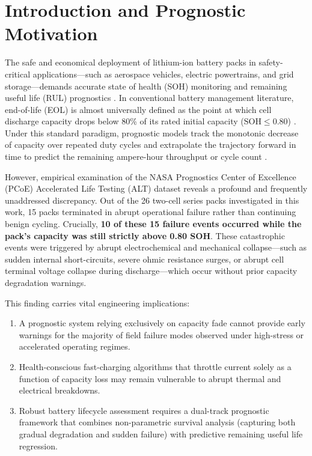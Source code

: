 \label{chap.7}

\section{Introduction and Prognostic Motivation}

The safe and economical deployment of lithium-ion battery packs
in safety-critical applications---such as aerospace vehicles,
electric powertrains, and grid storage---demands accurate state
of health (SOH) monitoring and remaining useful life (RUL) prognostics
\cite{saxena2015remaining, ge2021multistep}. In conventional battery
management literature, end-of-life (EOL) is almost universally defined as
the point at which cell discharge capacity drops below 80\% of its
rated initial capacity ($\mathrm{SOH} \le 0.80$)
\cite{bloom2001accelerated, han2019review}. Under this standard
paradigm, prognostic models track the monotonic decrease of capacity
over repeated duty cycles and extrapolate the trajectory forward in time
to predict the remaining ampere-hour throughput or cycle count
\cite{yang2018fast}.

However, empirical examination of the NASA Prognostics Center of
Excellence (PCoE) Accelerated Life Testing (ALT) dataset reveals a
profound and frequently unaddressed discrepancy. Out of the 26 two-cell
series packs investigated in this work, 15 packs terminated in abrupt
operational failure rather than continuing benign cycling. Crucially,
\textbf{10 of these 15 failure events occurred while the pack's
capacity was still strictly above 0.80 SOH}. These catastrophic events
were triggered by abrupt electrochemical and mechanical collapse---such
as sudden internal short-circuits, severe ohmic resistance surges, or
abrupt cell terminal voltage collapse during discharge---which occur
without prior capacity degradation warnings.

This finding carries vital engineering implications:
\begin{enumerate}
  \item A prognostic system relying exclusively on capacity fade cannot
  provide early warnings for the majority of field failure modes observed
  under high-stress or accelerated operating regimes.
  \item Health-conscious fast-charging algorithms that throttle current
  solely as a function of capacity loss may remain vulnerable to abrupt
  thermal and electrical breakdowns.
  \item Robust battery lifecycle assessment requires a dual-track
  prognostic framework that combines non-parametric survival analysis
  (capturing both gradual degradation and sudden failure) with
  predictive remaining useful life regression.
\end{enumerate}

